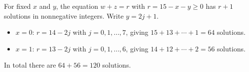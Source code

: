 For fixed $x$ and $y$, the equation $w+z=r$ with $r=15-x-y\ge0$ has $r+1$ solutions in nonnegative integers. Write $y=2j+1$.
\begin{itemize}
\item $x=0$: $r=14-2j$ with $j=0,1,\dots,7$, giving $15+13+\cdots+1=64$ solutions.
\item $x=1$: $r=13-2j$ with $j=0,1,\dots,6$, giving $14+12+\cdots+2=56$ solutions.
\end{itemize}
In total there are $64+56=\boxed{120}$ solutions.
